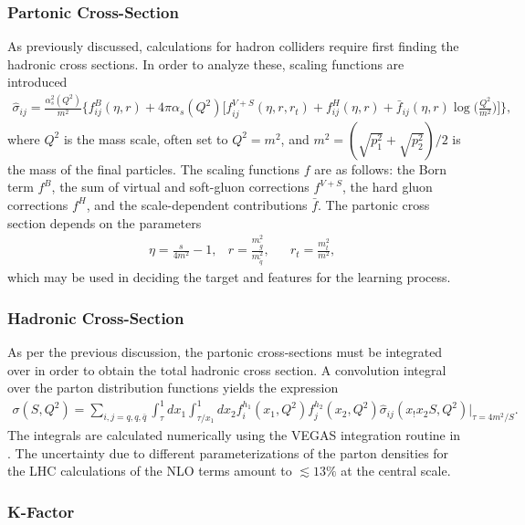 \documentclass[twoside,english]{uiofysmaster}
\begin{document}
\subsubsection{Partonic Cross-Section}

As previously discussed, calculations for hadron colliders require first finding the hadronic cross sections. In order to analyze these, scaling functions are introduced \cite{beenakker1997squark}
\begin{align}
\hat{\sigma}_{ij} = \frac{\alpha_s^2(Q^2)}{m^2} \Big\{ f^B_{ij}(\eta, r) + 4 \pi \alpha_s (Q^2) \Bigg[ f_{ij}^{V+S}(\eta, r, r_t) + f_{ij}^H (\eta, r) + \bar{f}_{ij} (\eta, r) \log \Bigg( \frac{Q^2}{m^2}\Bigg) \Bigg] \Big\}
,
\end{align}
where $Q^2$ is the mass scale, often set to $Q^2 = m^2$, and $m^2 = (\sqrt{p_1^2} + \sqrt{p_2^2})/2$ is the mass of the final particles. The scaling functions $f$ are as follows: the Born term $f^B$, the sum of virtual and soft-gluon corrections $f^{V+S}$, the hard gluon corrections $f^H$, and the scale-dependent contributions $\bar{f}$. The partonic cross section depends on the parameters
\begin{align}
&\eta = \frac{s}{4m^2} -1, &r= \frac{m_{\tilde{g}}^2}{m_{\tilde{q}}^2}, &&r_t = \frac{m_t^2}{m^2},
\end{align}
which may be used in deciding the target and features for the learning process.

\subsubsection{Hadronic Cross-Section}

As per the previous discussion, the partonic cross-sections must be integrated over in order to obtain the total hadronic cross section. A convolution integral over the parton distribution functions yields the expression 
\begin{align}
\sigma(S, Q^2) = \sum_{i,j=q, q, \bar{q}} \int_{\tau}^1dx_1 \int_{\tau/x_1}^1 dx_2 f_i^{h_1} (x_1, Q^2) f_j^{h_2}(x_2, Q^2) \hat{\sigma}_{ij} (x_!x_2S, Q^2)\Big|_{\tau=4m^2/S}.
\end{align}
The integrals are calculated numerically using the VEGAS integration routine \cite{PETERLEPAGE1978192} in \cite{beenakker1997squark}.
The uncertainty due to different parameterizations of the parton densities for the LHC calculations of the NLO terms amount to $\lesssim 13 \%$ at the central scale.

\subsubsection{K-Factor}
\end{document}
